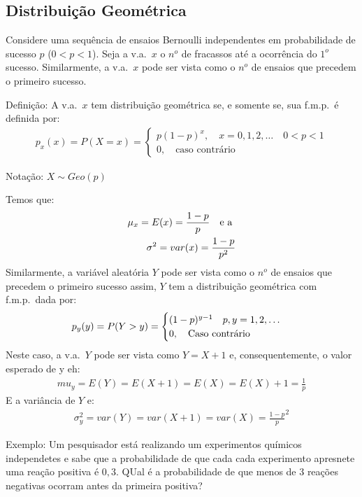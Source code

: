 \documentclass[11pt,a4paper]{book}
\begin{document}
      \subsection{Distribuição Geométrica}
      \begin{description}
        \item  Considere uma sequência de ensaios Bernoulli independentes em probabilidade de 
      sucesso $p$ ($0<p<1$). Seja a v.a.\ $x$ o $n^o$ de fracassos até a ocorrência 
      do $1^o$ sucesso. Similarmente, a v.a.\ $x$ pode ser vista como o $n^o$ de ensaios que precedem 
      o primeiro sucesso.

    \item{Definição}: A v.a.\ $x$ tem distribuição geométrica se, e somente se, sua 
      f.m.p.\ é definida por: 
      \begin{align}
        p_{x}(x)=P(X=x)=\begin{cases}
          p(1-p)^x, \quad x=0,1,2,\dots \quad 0<p<1\\
          0, \quad \text{caso contrário}
        \end{cases}
      \end{align}
      \begin{center}Notação: $X \sim Geo(p)$\end{center}
      Temos que:
      \begin{align}
        \mu_{x}=E(x)=\frac{1-p}{p} \text{\quad e a }\\
        \sigma^2 = var(x)=\frac{1-p}{p^2}
      \end{align}
      Similarmente, a variável aleatória $Y$ pode ser vista como o $n^o$ de ensaios que
      precedem o primeiro sucesso assim, $Y$ tem a distribuição geométrica com f.m.p.\ dada por:
        \begin{align}
        p_y(y)=P(Y>y)=\begin{cases}
          (1-p)^{y-1} \text{\quad }p,y=1,2,\dots \\
          0, \text{\quad Caso contrário}
        \end{cases}
      \end{align}
      Neste caso, a v.a.\ $Y$ pode ser vista como $Y=X+1$ e, consequentemente, o valor esperado de y eh:
      \begin{align} 
      mu_y=E(Y)=E(X+1)=E(X)=E(X)+1= \frac{1}{p}
    \end{align}
    E a variância de $Y$ e:
    \begin{align}
      \sigma_y^2=var(Y)=var(X+1)=var(X)= \frac{1-p}{p}^2
    \end{align}
  \item{Exemplo}: Um pesquisador está realizando um experimentos químicos independetes 
      e sabe que a probabilidade de que cada cada experimento apresnete uma reação 
      positiva é $0,3$. QUal é a probabilidade de que menos de 3 reações negativas 
      ocorram antes da primeira positiva?


\end{description}
\end{document}
